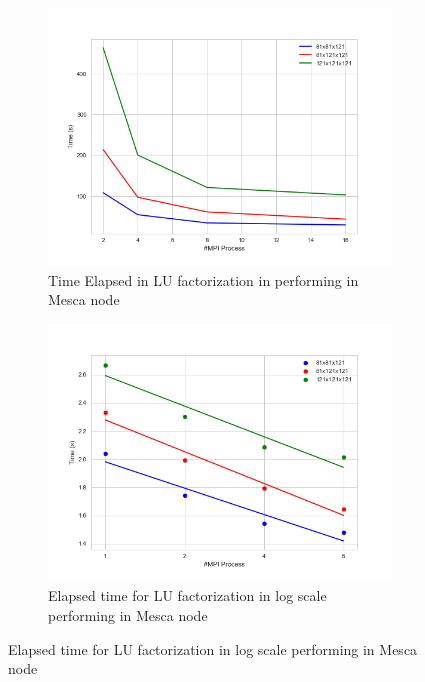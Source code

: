 \begin{figure}
\centering 
  \begin{subfigure}[b]{0.7\textwidth}
    \includegraphics[width=\textwidth]{images/TimeMescaLU.png}
    \caption{Time Elapsed in LU factorization in  performing in Mesca node}
    \label{TimeMescaLU}
  \end{subfigure}
  \begin{subfigure}[b]{0.7\textwidth}
    \includegraphics[width=\textwidth]{images/TimeMescaMPIlog.png}
    \caption{Elapsed time for LU factorization in log scale performing in Mesca node}
    \label{TimeMescaMPIlog}
  \end{subfigure}
\end{figure} 

